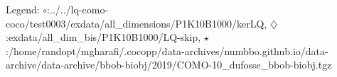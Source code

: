 Legend: {\color{NavyBlue}$\circ$}:../../lq-como-coco/test0003/exdata/all\_dimensions/P1K10B1000/kerLQ, {\color{Magenta}$\diamondsuit$}:exdata/all\_dim\_bis/P1K10B1000/LQ-skip, {\color{Orange}$\star$}:/home/randopt/mgharafi/.cocopp/data-archives/numbbo.github.io/data-archive/data-archive/bbob-biobj/2019/COMO-10\_dufosse\_bbob-biobj.tgz